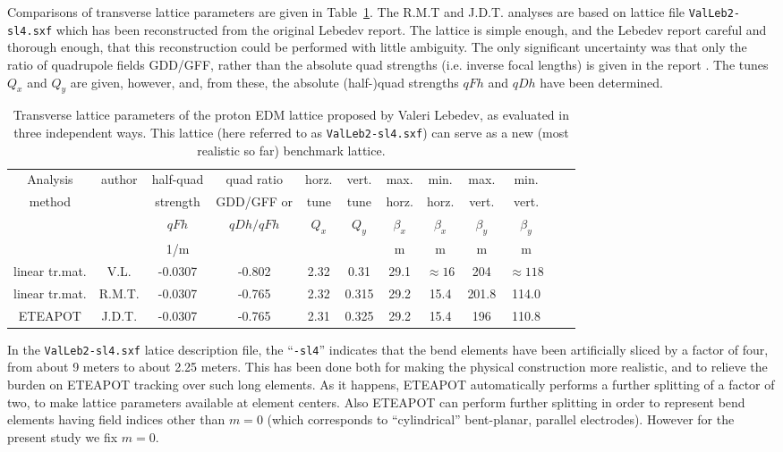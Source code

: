 \documentclass[12]{article}
\begin{document}
Comparisons of transverse lattice parameters are given in Table~\ref{tbl:TransverseParams}.
The R.M.T and J.D.T. analyses are based on lattice file {\tt ValLeb2-sl4.sxf} which
has been reconstructed from the original Lebedev\cite{ValLeb2} report. The lattice
is simple enough, and the Lebedev report careful and thorough enough, that this
reconstruction could be performed with little ambiguity. The only significant
uncertainty was that only the ratio of quadrupole fields GDD/GFF, rather than
the absolute quad strengths (i.e. inverse focal lengths) is given in the report 
\cite{ValLeb2}. The tunes $Q_x$ and $Q_y$ are given, however, and, from these, 
the absolute (half-)quad strengths $qFh$ and $qDh$ have been determined.
%
\begin{table}[h]
\caption{\label{tbl:TransverseParams}Transverse lattice parameters of the proton EDM 
lattice proposed by Valeri Lebedev\cite {Benchmark-I}, as evaluated in three independent 
ways. This lattice (here referred to as {\tt ValLeb2-sl4.sxf}) can serve as a new
(most realistic so far) benchmark lattice. 
} 
\medskip
\centering
\begin{tabular}{|c|c|c|c|c|c|c|c|c|c|c|c|}           \hline
Analysis   & author & half-quad & quad ratio & horz. & vert. &     max.     &     min.      &     max.      &     min.      \\
 method    &        &  strength & GDD/GFF or & tune  & tune  &    horz.     &     horz.     &    vert.      &    vert.      \\ 
           &        &  $qFh$    & $qDh/qFh$  & $Q_x$ & $Q_y$ &   $\beta_x$   &   $\beta_x$   &   $\beta_y$   & $\beta_y$     \\ \hline
           &        &   1/m     &            &       &       &       m       &      m        &      m        &      m        \\ \hline
linear tr.mat. &  V.L.  & -0.0307   &  -0.802    & 2.32  & 0.31  &      29.1     & $\approx16$   &    204        &  $\approx118$ \\     
linear tr.mat. & R.M.T. & -0.0307   &  -0.765    & 2.32  & 0.315 &      29.2     &    15.4       &   201.8       &   114.0       \\ 
ETEAPOT    & J.D.T. & -0.0307   &  -0.765    & 2.31  & 0.325 &      29.2     &    15.4       &    196        &   110.8       \\  
\hline
\end{tabular}
\end{table}
%

In the {\tt ValLeb2-sl4.sxf} latice description file, the ``{\tt -sl4}'' indicates
that the bend elements have been artificially sliced by a factor of four, from
about 9 meters to about 2.25 meters. This has been done both for making the
physical construction more realistic, and to relieve the burden on ETEAPOT tracking
over such long elements. As it happens, ETEAPOT automatically performs a further
splitting of a factor of two, to make lattice parameters available at element
centers. Also ETEAPOT can perform further splitting in order to represent bend
elements having field indices other than $m=0$ (which corresponds to ``cylindrical''
bent-planar, parallel electrodes). However for the present study we fix $m=0$.
\end{document}
